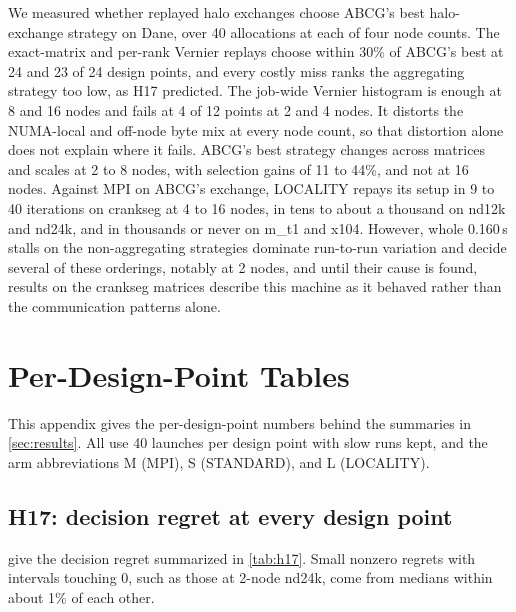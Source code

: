 \documentclass[11pt]{article}
\begin{document}
We measured whether replayed halo exchanges choose ABCG's best halo-exchange strategy on
Dane, over 40 allocations at each of four node counts. The exact-matrix and per-rank
Vernier replays choose within 30\% of ABCG's best at 24 and 23 of 24 design points, and
every costly miss ranks the aggregating strategy too low, as H17 predicted.
The job-wide Vernier histogram is enough at 8 and 16 nodes and fails at 4 of 12 points at
2 and 4 nodes. It distorts the NUMA-local and off-node byte mix at every node count, so
that distortion alone does not explain where it fails. ABCG's best
strategy changes across matrices and scales at 2 to 8 nodes, with selection gains of 11 to
44\%, and not at 16 nodes. Against MPI on ABCG's exchange, LOCALITY repays its setup in 9 to 40
iterations on crankseg at 4 to 16 nodes, in tens to about a thousand on nd12k and nd24k,
and in thousands or never on m\_t1 and x104. However, whole
0.160\,s stalls on the non-aggregating strategies dominate run-to-run variation and decide
several of these orderings, notably at 2 nodes, and until their cause is found, results on
the crankseg matrices describe this machine as it behaved rather than the communication
patterns alone.




\appendix
\section{Per-Design-Point Tables}
\label{app:tables}

This appendix gives the per-design-point numbers behind the summaries in
\cref{sec:results}. All use 40 launches per design point with slow runs kept, and the
arm abbreviations M (MPI), S (STANDARD), and L (LOCALITY).

\subsection{H17: decision regret at every design point}

 give the decision regret
summarized in \cref{tab:h17}. Small nonzero regrets with intervals touching 0, such as
those at 2-node nd24k, come from medians within about 1\% of each other.
\end{document}
